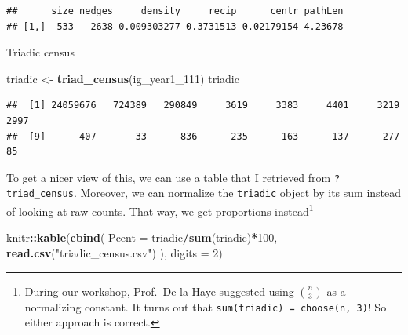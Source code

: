 \documentclass[
]{book}
\newenvironment{Shaded}{\begin{snugshade}}{\end{snugshade}}
\newcommand{\AttributeTok}[1]{\textcolor[rgb]{0.13,0.29,0.53}{#1}}
\newcommand{\DecValTok}[1]{\textcolor[rgb]{0.00,0.00,0.81}{#1}}
\newcommand{\FunctionTok}[1]{\textcolor[rgb]{0.13,0.29,0.53}{\textbf{#1}}}
\newcommand{\NormalTok}[1]{#1}
\newcommand{\OtherTok}[1]{\textcolor[rgb]{0.56,0.35,0.01}{#1}}
\newcommand{\SpecialCharTok}[1]{\textcolor[rgb]{0.81,0.36,0.00}{\textbf{#1}}}
\newcommand{\StringTok}[1]{\textcolor[rgb]{0.31,0.60,0.02}{#1}}
\begin{document}
\begin{verbatim}
##      size nedges     density     recip      centr pathLen
## [1,]  533   2638 0.009303277 0.3731513 0.02179154 4.23678
\end{verbatim}

Triadic census

\begin{Shaded}
\begin{Highlighting}[]
\NormalTok{triadic }\OtherTok{\textless{}{-}} \FunctionTok{triad\_census}\NormalTok{(ig\_year1\_111)}
\NormalTok{triadic}
\end{Highlighting}
\end{Shaded}

\begin{verbatim}
##  [1] 24059676   724389   290849     3619     3383     4401     3219     2997
##  [9]      407       33      836      235      163      137      277       85
\end{verbatim}

To get a nicer view of this, we can use a table that I retrieved from \texttt{?triad\_census}. Moreover, we can normalize the \texttt{triadic} object by its sum instead of looking at raw counts. That way, we get proportions instead\footnote{During our workshop, Prof.~De la Haye suggested using \({n \choose 3}\) as a normalizing constant. It turns out that \texttt{sum(triadic)\ =\ choose(n,\ 3)}! So either approach is correct.}

\begin{Shaded}
\begin{Highlighting}[]
\NormalTok{knitr}\SpecialCharTok{::}\FunctionTok{kable}\NormalTok{(}\FunctionTok{cbind}\NormalTok{(}
  \AttributeTok{Pcent =}\NormalTok{ triadic}\SpecialCharTok{/}\FunctionTok{sum}\NormalTok{(triadic)}\SpecialCharTok{*}\DecValTok{100}\NormalTok{,}
  \FunctionTok{read.csv}\NormalTok{(}\StringTok{"triadic\_census.csv"}\NormalTok{)}
\NormalTok{  ), }\AttributeTok{digits =} \DecValTok{2}\NormalTok{)}
\end{Highlighting}
\end{Shaded}
\end{document}
